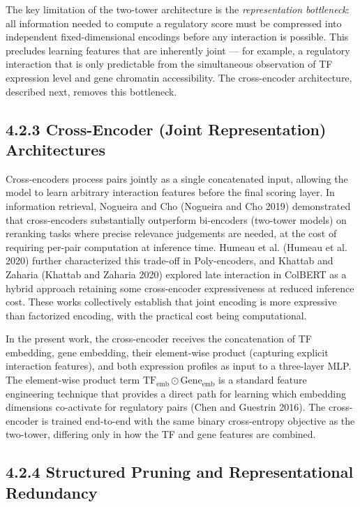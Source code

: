 \documentclass[
  12pt,
]{report}
\begin{document}
The key limitation of the two-tower architecture is the
\emph{representation bottleneck}: all information needed to compute a
regulatory score must be compressed into independent fixed-dimensional
encodings before any interaction is possible. This precludes learning
features that are inherently joint --- for example, a regulatory
interaction that is only predictable from the simultaneous observation
of TF expression level and gene chromatin accessibility. The
cross-encoder architecture, described next, removes this bottleneck.

\subsection{4.2.3 Cross-Encoder (Joint Representation)
Architectures}\label{cross-encoder-joint-representation-architectures}

Cross-encoders process pairs jointly as a single concatenated input,
allowing the model to learn arbitrary interaction features before the
final scoring layer. In information retrieval, Nogueira and Cho
(Nogueira and Cho 2019) demonstrated that cross-encoders substantially
outperform bi-encoders (two-tower models) on reranking tasks where
precise relevance judgements are needed, at the cost of requiring
per-pair computation at inference time. Humeau et al. (Humeau et al.
2020) further characterized this trade-off in Poly-encoders, and Khattab
and Zaharia (Khattab and Zaharia 2020) explored late interaction in
ColBERT as a hybrid approach retaining some cross-encoder expressiveness
at reduced inference cost. These works collectively establish that joint
encoding is more expressive than factorized encoding, with the practical
cost being computational.

In the present work, the cross-encoder receives the concatenation of TF
embedding, gene embedding, their element-wise product (capturing
explicit interaction features), and both expression profiles as input to
a three-layer MLP. The element-wise product term
\(\text{TF}_\text{emb} \odot \text{Gene}_\text{emb}\) is a standard
feature engineering technique that provides a direct path for learning
which embedding dimensions co-activate for regulatory pairs (Chen and
Guestrin 2016). The cross-encoder is trained end-to-end with the same
binary cross-entropy objective as the two-tower, differing only in how
the TF and gene features are combined.

\subsection{4.2.4 Structured Pruning and Representational
Redundancy}\label{structured-pruning-and-representational-redundancy}
\end{document}
